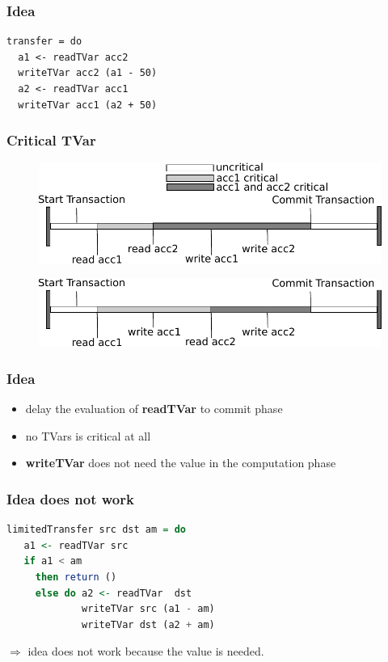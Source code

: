 \documentclass{beamer}
\newcommand{\code}[1]{\textbf{#1}}
\begin{document}
\begin{frame}[fragile]
\frametitle{Idea}
\begin{lstlisting}
transfer = do 
  a1 <- readTVar acc2
  writeTVar acc2 (a1 - 50)
  a2 <- readTVar acc1
  writeTVar acc1 (a2 + 50)
\end{lstlisting}
\end{frame}
  
     
  \begin{frame}
   \frametitle{Critical TVar}
   \begin{figure}
    \includegraphics[scale=0.7]{ressources/CriticalValue.pdf}
   \end{figure}
   \begin{figure}
    \includegraphics[scale=0.7]{ressources/CriticalValue2.pdf}
   \end{figure}
   \end{frame}

\begin{frame}
 \frametitle{Idea}
 \begin{itemize}\setlength\itemsep{1em}
  \item delay the evaluation of \code{readTVar} to commit phase
  \item no TVars is critical at all  
  \item \code{writeTVar} does not need the value in the computation phase
 \end{itemize}
\end{frame}
  
\begin{frame}[fragile]
   \frametitle{Idea does not work}
   \begin{lstlisting}[language=Haskell]
limitedTransfer src dst am = do
   a1 <- readTVar src
   if a1 < am
     then return ()
     else do a2 <- readTVar  dst
             writeTVar src (a1 - am)
             writeTVar dst (a2 + am)
   \end{lstlisting}
   \vfill
   $\Rightarrow$ idea does not work because the value is needed.
\end{frame}
\end{document}
